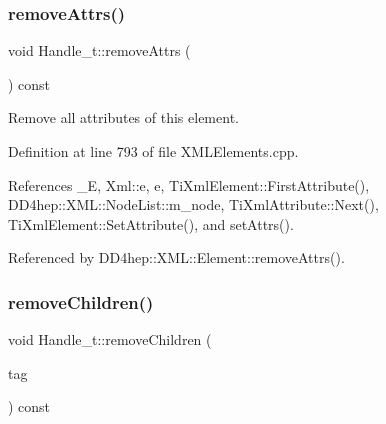 \hypertarget{class_d_d4hep_1_1_x_m_l_1_1_handle__t_a246861dcf2b68f4093ef295b8e96aaeb}{}\label{class_d_d4hep_1_1_x_m_l_1_1_handle__t_a246861dcf2b68f4093ef295b8e96aaeb} 
\subsubsection{\texorpdfstring{remove\+Attrs()}{removeAttrs()}}
{\footnotesize\ttfamily void Handle\+\_\+t\+::remove\+Attrs (\begin{DoxyParamCaption}{ }\end{DoxyParamCaption}) const}



Remove all attributes of this element. 



Definition at line 793 of file X\+M\+L\+Elements.\+cpp.



References \+\_\+E, Xml\+::e, e, Ti\+Xml\+Element\+::\+First\+Attribute(), D\+D4hep\+::\+X\+M\+L\+::\+Node\+List\+::m\+\_\+node, Ti\+Xml\+Attribute\+::\+Next(), Ti\+Xml\+Element\+::\+Set\+Attribute(), and set\+Attrs().



Referenced by D\+D4hep\+::\+X\+M\+L\+::\+Element\+::remove\+Attrs().

\hypertarget{class_d_d4hep_1_1_x_m_l_1_1_handle__t_a33c004e7806b7e868ca914900ed11611}{}\label{class_d_d4hep_1_1_x_m_l_1_1_handle__t_a33c004e7806b7e868ca914900ed11611} 
\subsubsection{\texorpdfstring{remove\+Children()}{removeChildren()}}
{\footnotesize\ttfamily void Handle\+\_\+t\+::remove\+Children (\begin{DoxyParamCaption}\item[{const \hyperlink{namespace_d_d4hep_1_1_x_m_l_a09e5d9cc86ed782f6826dfe0778c1815}{Xml\+Char} $\ast$}]{tag }\end{DoxyParamCaption}) const}



